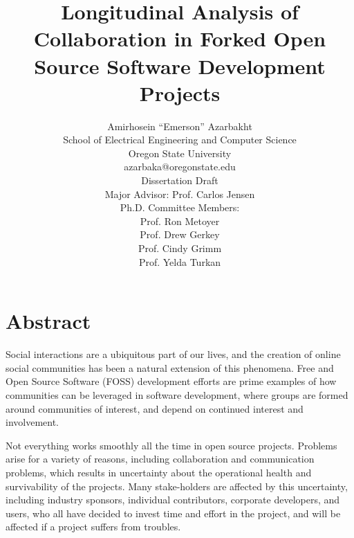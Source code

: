 \documentclass[12pt]{report}
\begin{document}
\title{Longitudinal Analysis of Collaboration in Forked Open Source Software Development Projects}

\author{Amirhosein ``Emerson'' Azarbakht\\
School of Electrical Engineering and Computer Science\\
Oregon State University\\
\vspace{5mm} %
azarbaka@oregonstate.edu\\
\vspace{5mm} %
Dissertation Draft\\
Major Advisor: Prof. Carlos Jensen\\
Ph.D. Committee Members:\\
Prof. Ron Metoyer\\
Prof. Drew Gerkey\\
Prof. Cindy Grimm\\
Prof. Yelda Turkan\\
}

\maketitle

\tableofcontents

\thispagestyle{empty}
\listoffigures
\listoftables

\pagebreak

\section{Abstract}

Social interactions are a ubiquitous part of our lives, and the creation of online social communities has been a natural extension of this phenomena. Free and Open Source Software (FOSS) development efforts are prime examples of how communities can be leveraged in software development, where groups are formed around communities of interest, and depend on continued interest and involvement.

Not everything works smoothly all the time in open source projects. Problems arise for a variety of reasons, including collaboration and communication problems, which results in uncertainty about the operational health and survivability of the projects. Many stake-holders are affected by this uncertainty, including industry sponsors, individual contributors, corporate developers, and users, who all have decided to invest time and effort in the project, and will be affected if a project suffers from troubles.
\end{document}
